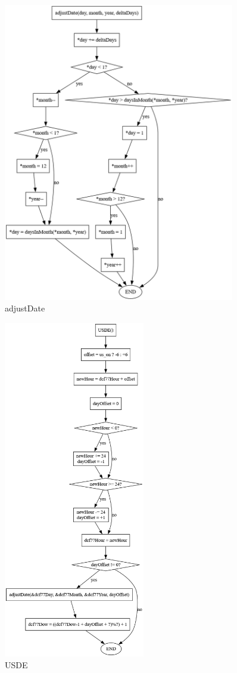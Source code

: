 \documentclass[a4paper,12pt]{article}
\begin{document}
\begin{figure}[H]
    \centering
    \includegraphics[width=0.9\textwidth]{diagrams/12.adjustDate.png}
    \caption{adjustDate}
    \label{fig:adjustDate}
\end{figure}

\begin{figure}[H]
    \centering
    \includegraphics[width=0.55\textwidth]{diagrams/13.USDE.png}
    \caption{USDE}
    \label{fig:USDE}
\end{figure}
\end{document}
